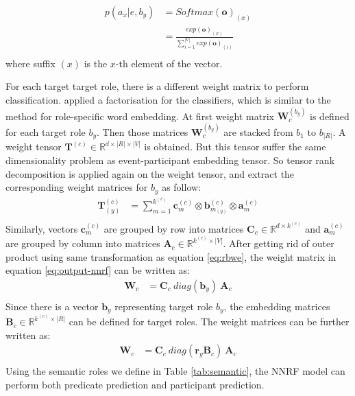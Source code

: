 \documentclass[a4paper]{article}
\begin{document}
\begin{equation} \label{eq:softmax-nnrf}
\begin{aligned}
    p(a_x | e, b_y)
        &= Softmax(\mathbf{o})_{(x)} \\
        &= \frac{
        exp(\mathbf{o})_{(x)}
        }{
        \sum_{i=1}^{|V|} exp(\mathbf{o})_{(i)} }   \\
\end{aligned}
\end{equation}
where suffix $(x)$ is the $x$-th element of the vector. 

For each target target role, there is a different weight matrix to perform classification. \citet{tilk2016event} applied a factorisation for the classifiers, which is similar to the method for role-specific word embedding. At first weight matrix $\mathbf{W}_c^{(b_y)}$ is defined for each target role $b_y$. Then those matrices $\mathbf{W}_c^{(b_y)}$ are stacked from $b_1$ to $b_{|R|}$. A weight tensor $\mathbf{T}^{(c)} \in \mathbb{R}^{d \times |R| \times |V|}$ is obtained. But this tensor suffer the same dimensionality problem as event-participant embedding tensor. So tensor rank decomposition is applied again on the weight tensor, and extract the corresponding weight matrices for $b_y$ as follow: 
\begin{equation} \label{eq:trd-cls}
\begin{aligned}
    \mathbf{T}_{(y)}^{(c)}
        &= \sum_{m=1}^{k^{(c)}} \mathbf{c}_{m}^{(c)} \otimes \mathbf{b}_{m_{(y)}}^{(c)} \otimes \mathbf{a}_m^{(c)} \\
\end{aligned}
\end{equation}
Similarly, vectors $\mathbf{c}_{m}^{(c)}$ are grouped by row into matrices $\mathbf{C}_c \in \mathbb{R}^{d \times k^{(c)}}$ and $\mathbf{a}_m^{(c)}$ are grouped by column into matrices $\mathbf{A}_c \in \mathbb{R}^{k^{(c)} \times |V|}$. After getting rid of outer product using same transformation as equation \eqref{eq:rbwe}, the weight matrix in equation \eqref{eq:output-nnrf}  can be written as:
\begin{equation} \label{eq:cls}
\begin{aligned}
    \mathbf{W}_c
        &= \mathbf{C}_c \ diag(\mathbf{b}_y) \ \mathbf{A}_c \\
\end{aligned}
\end{equation}
Since there is a vector $\mathbf{b}_y$ representing target role $b_y$, the embedding matrices $\mathbf{B}_c \in \mathbb{R}^{k^{(c)} \times |R|}$ can be defined for target roles. The weight matrices can be further written as:
\begin{equation} \label{eq:cls-temb}
\begin{aligned}
    \mathbf{W}_c
        &= \mathbf{C}_c \ diag(\mathbf{r}_y \mathbf{B}_c) \ \mathbf{A}_c \\
\end{aligned}
\end{equation}
Using the semantic roles we define in Table \ref{tab:semantic}, the NNRF model can perform both predicate prediction and participant prediction. 
\end{document}
